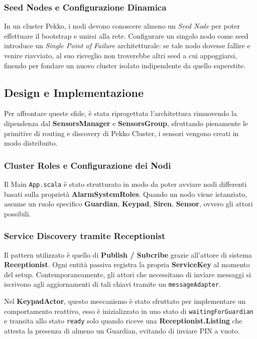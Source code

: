 \subsubsection{Seed Nodes e Configurazione Dinamica}
In un cluster Pekko, i nodi devono conoscere almeno un \textit{Seed Node} per poter effettuare il bootstrap e unirsi alla rete. Configurare un singolo nodo come seed introduce un \textit{Single Point of Failure} architetturale: se tale nodo dovesse fallire e venire riavviato, al suo risveglio non troverebbe altri seed a cui appoggiarsi, finendo per fondare un nuovo cluster isolato indipendente da quello superstite.

\newpage
\subsection{Design e Implementazione}
Per affrontare queste sfide, è stata riprogettata l'architettura rimuovendo la dipendenza dal \textbf{SensorsManager} e \textbf{SensorsGroup}, sfruttando pienamente le primitive di routing e discovery di Pekko Cluster, i sensori vengono creati in modo distribuito.

\subsubsection{Cluster Roles e Configurazione dei Nodi}
Il Main \texttt{App.scala} è stato strutturato in modo da poter avviare nodi differenti basati sulla proprietà \textbf{AlarmSystemRoles}. Quando un nodo viene istanziato, assume un ruolo specifico \textbf{Guardian}, \textbf{Keypad}, \textbf{Siren}, \textbf{Sensor}, ovvero gli attori possibili.

\subsubsection{Service Discovery tramite Receptionist}
Il pattern utilizzato è quello di \textbf{Publish / Subcribe} grazie all'attore di sistema \textbf{Receptionist}. 
Ogni entità passiva registra la propria \textbf{ServiceKey} al momento del setup. Contemporaneamente, gli attori che necessitano di inviare messaggi si iscrivono agli aggiornamenti di tali chiavi tramite un \texttt{messageAdapter}. 

Nel \textbf{KeypadActor}, questo meccanismo è stato sfruttato per implementare un comportamento reattivo, esso è inizializzato in uno stato di \texttt{waitingForGuardian} e transita allo stato \texttt{ready} solo quando riceve una \textbf{Receptionist.Listing} che attesta la presenza di almeno un Guardian, evitando di inviare PIN a vuoto.

